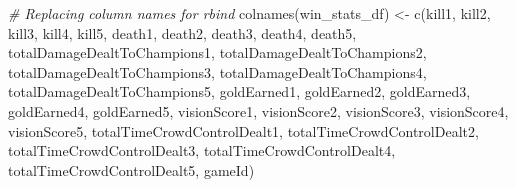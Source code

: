 \documentclass[
]{article}
\newenvironment{Shaded}{\begin{snugshade}}{\end{snugshade}}
\newcommand{\CommentTok}[1]{\textcolor[rgb]{0.56,0.35,0.01}{\textit{#1}}}
\newcommand{\FunctionTok}[1]{\textcolor[rgb]{0.00,0.00,0.00}{#1}}
\newcommand{\NormalTok}[1]{#1}
\newcommand{\OtherTok}[1]{\textcolor[rgb]{0.56,0.35,0.01}{#1}}
\newcommand{\StringTok}[1]{\textcolor[rgb]{0.31,0.60,0.02}{#1}}
\begin{document}
\begin{Shaded}
\begin{Highlighting}[]
\CommentTok{\# Replacing column names for rbind}
\FunctionTok{colnames}\NormalTok{(win\_stats\_df) }\OtherTok{\textless{}{-}} \FunctionTok{c}\NormalTok{(}\StringTok{\textquotesingle{}kill1\textquotesingle{}}\NormalTok{, }\StringTok{\textquotesingle{}kill2\textquotesingle{}}\NormalTok{, }\StringTok{\textquotesingle{}kill3\textquotesingle{}}\NormalTok{, }\StringTok{\textquotesingle{}kill4\textquotesingle{}}\NormalTok{, }\StringTok{\textquotesingle{}kill5\textquotesingle{}}\NormalTok{, }\StringTok{\textquotesingle{}death1\textquotesingle{}}\NormalTok{, }\StringTok{\textquotesingle{}death2\textquotesingle{}}\NormalTok{, }\StringTok{\textquotesingle{}death3\textquotesingle{}}\NormalTok{, }\StringTok{\textquotesingle{}death4\textquotesingle{}}\NormalTok{, }\StringTok{\textquotesingle{}death5\textquotesingle{}}\NormalTok{, }\StringTok{\textquotesingle{}totalDamageDealtToChampions1\textquotesingle{}}\NormalTok{, }\StringTok{\textquotesingle{}totalDamageDealtToChampions2\textquotesingle{}}\NormalTok{, }\StringTok{\textquotesingle{}totalDamageDealtToChampions3\textquotesingle{}}\NormalTok{, }\StringTok{\textquotesingle{}totalDamageDealtToChampions4\textquotesingle{}}\NormalTok{, }\StringTok{\textquotesingle{}totalDamageDealtToChampions5\textquotesingle{}}\NormalTok{, }\StringTok{\textquotesingle{}goldEarned1\textquotesingle{}}\NormalTok{, }\StringTok{\textquotesingle{}goldEarned2\textquotesingle{}}\NormalTok{, }\StringTok{\textquotesingle{}goldEarned3\textquotesingle{}}\NormalTok{, }\StringTok{\textquotesingle{}goldEarned4\textquotesingle{}}\NormalTok{, }\StringTok{\textquotesingle{}goldEarned5\textquotesingle{}}\NormalTok{, }\StringTok{\textquotesingle{}visionScore1\textquotesingle{}}\NormalTok{, }\StringTok{\textquotesingle{}visionScore2\textquotesingle{}}\NormalTok{, }\StringTok{\textquotesingle{}visionScore3\textquotesingle{}}\NormalTok{, }\StringTok{\textquotesingle{}visionScore4\textquotesingle{}}\NormalTok{, }\StringTok{\textquotesingle{}visionScore5\textquotesingle{}}\NormalTok{, }\StringTok{\textquotesingle{}totalTimeCrowdControlDealt1\textquotesingle{}}\NormalTok{, }\StringTok{\textquotesingle{}totalTimeCrowdControlDealt2\textquotesingle{}}\NormalTok{, }\StringTok{\textquotesingle{}totalTimeCrowdControlDealt3\textquotesingle{}}\NormalTok{, }\StringTok{\textquotesingle{}totalTimeCrowdControlDealt4\textquotesingle{}}\NormalTok{, }\StringTok{\textquotesingle{}totalTimeCrowdControlDealt5\textquotesingle{}}\NormalTok{, }\StringTok{\textquotesingle{}gameId\textquotesingle{}}\NormalTok{)}

\end{Highlighting}
\end{Shaded}
\end{document}
